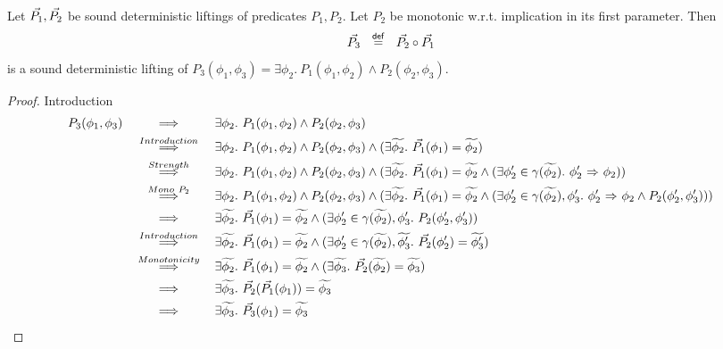\begin{lemma}~\\
    \label{lemma:det-lift-comp}
    Let $\vec{P_1}, \vec{P_2}$ be sound deterministic liftings of predicates $P_1, P_2$.
    Let $P_2$ be monotonic w.r.t. implication in its first parameter.
    Then
    \begin{displaymath}
    \vec{P_3} ~~\overset{\textup{\textmd{\textsf{def}}}}{=}~~ \vec{P_2} \circ \vec{P_1}
    \end{displaymath}
    is a sound deterministic lifting of $P_3(\phi_1, \phi_3) = \exists \phi_2.~ P_1(\phi_1, \phi_2) \wedge P_2(\phi_2, \phi_3)$.
\end{lemma}
\begin{proof}
    Introduction
    \begin{align*}
    P_3(\phi_1, \phi_3)
    & \overset{}{~\quad\quad\implies\quad\quad~} 
    \exists \phi_2.~ P_1(\phi_1, \phi_2) \wedge P_2(\phi_2, \phi_3)\\
    & \overset{Introduction}{~\quad\quad\implies\quad\quad~} 
    \exists \phi_2.~ P_1(\phi_1, \phi_2) \wedge P_2(\phi_2, \phi_3)
    \wedge (\exists \widetilde{\phi_2}.~ \vec{P_1}(\phi_1) = \widetilde{\phi_2})\\
    & \overset{Strength}{~\quad\quad\implies\quad\quad~} 
    \exists \phi_2.~ P_1(\phi_1, \phi_2) \wedge P_2(\phi_2, \phi_3)
    \wedge (\exists \widetilde{\phi_2}.~ \vec{P_1}(\phi_1) = \widetilde{\phi_2} \wedge 
           (\exists \phi_2' \in \gamma(\widetilde{\phi_2}).~ {\phi_2'} \,\,{\Rightarrow}\,\, {\phi_2}))\\
    & \overset{Mono~P_2}{~\quad\quad\implies\quad\quad~} 
           \exists \phi_2.~ P_1(\phi_1, \phi_2) \wedge P_2(\phi_2, \phi_3)
           \wedge (\exists \widetilde{\phi_2}.~ \vec{P_1}(\phi_1) = \widetilde{\phi_2} \wedge 
           (\exists \phi_2' \in \gamma(\widetilde{\phi_2}), \phi_3'.~ {\phi_2'} \,\,{\Rightarrow}\,\, {\phi_2} \wedge P_2(\phi_2', \phi_3')))\\
    & \overset{}{~\quad\quad\implies\quad\quad~} 
           \exists \widetilde{\phi_2}.~ \vec{P_1}(\phi_1) = \widetilde{\phi_2} \wedge 
           (\exists \phi_2' \in \gamma(\widetilde{\phi_2}), \phi_3'.~ P_2(\phi_2', \phi_3'))\\
    & \overset{Introduction}{~\quad\quad\implies\quad\quad~} 
           \exists \widetilde{\phi_2}.~ \vec{P_1}(\phi_1) = \widetilde{\phi_2} \wedge 
           (\exists \phi_2' \in \gamma(\widetilde{\phi_2}), \widetilde{\phi_3'}.~ \vec{P_2}(\phi_2') = \widetilde{\phi_3'})\\
    & \overset{Monotonicity}{~\quad\quad\implies\quad\quad~} 
           \exists \widetilde{\phi_2}.~ \vec{P_1}(\phi_1) = \widetilde{\phi_2} \wedge 
           (\exists \widetilde{\phi_3}.~ \vec{P_2}(\widetilde{\phi_2}) = \widetilde{\phi_3})\\
    & \overset{}{~\quad\quad\implies\quad\quad~} 
           \exists \widetilde{\phi_3}.~ \vec{P_2}(\vec{P_1}(\phi_1)) = \widetilde{\phi_3}\\
    & \overset{}{~\quad\quad\implies\quad\quad~} 
           \exists \widetilde{\phi_3}.~ \vec{P_3}(\phi_1) = \widetilde{\phi_3}
    \end{align*}
    

\end{proof}
